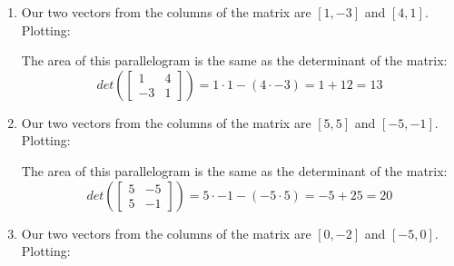 \begin{Answer}[ref = geo_det]
\begin{enumerate}
    \item Our two vectors from the columns of the matrix are $\left[1, -3 
    \right]$ and $\left[4, 1 \right]$. Plotting:
    

    The area of this parallelogram is the same as the determinant of the matrix:
    $$det\left( \begin{bmatrix}
        1 & 4\\
        -3 &1
    \end{bmatrix} \right) = 1 \cdot 1 - \left( 4 \cdot -3 \right) = 1 + 12 = 13$$

    \item Our two vectors from the columns of the matrix are $\left[5, 5 
    \right]$ and $\left[-5, -1 \right]$. Plotting:


    The area of this parallelogram is the same as the determinant of the 
    matrix:
    $$det \left( \begin{bmatrix}
        5 & -5\\
        5 & -1
    \end{bmatrix} \right) = 5 \cdot -1 - \left( -5 \cdot 5 \right) = -5 + 25 = 
    20$$

    \item Our two vectors from the columns of the matrix are $\left[ 0, -2 
    \right]$ and $\left[ -5, 0 \right]$. Plotting:


\end{enumerate}
\end{Answer}
